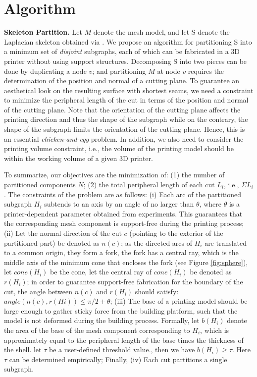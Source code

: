 \section{Algorithm}
\textbf{Skeleton Partition.} Let $M$ denote the mesh model, and let S denote the Laplacian skeleton obtained via \cite{AuTCCL08}. We propose an algorithm for partitioning S into a minimum set of \emph{disjoint} subgraphs, each of which can be fabricated in a 3D printer without using support structures. Decomposing S into two pieces can be done by duplicating a node $v$; and partitioning $M$ at node $v$ requires the determination of the position and normal of a cutting plane. To guarantee an aesthetical look on the resulting surface with shortest seams, we need a constraint to minimize the peripheral length of the cut in terms of the position and normal of the cutting plane. Note that the orientation of the cutting plane affects the printing direction and thus the shape of the subgraph while on the contrary, the shape of the subgraph limits the orientation of the cutting plane. Hence, this is an essential \emph{chicken-and-egg} problem. In addition, we also need to consider the printing volume constraint, i.e., the volume of the printing model should be within the working volume of a given 3{D} printer.

To summarize, our objectives are the minimization of: (1) the number of partitioned components $N$; (2) the total peripheral length of each cut $L_i$, i.e., $\Sigma L_i$. The constraints of the problem are as follows:
(i) Each arc of the partitioned subgraph $H_i$ subtends to an axis by an angle of no larger than $\theta$, where $\theta$ is a printer-dependent parameter obtained from experiments. This guarantees that the corresponding mesh component is support-free during the printing process;
(ii) Let the normal direction of the cut $c$ (pointing to the exterior of the partitioned part) be denoted as $n(c)$; as the directed arcs of $H_i$ are translated to a common origin, they form a fork, the fork has a central ray, which is the middle axis of the minimum cone that encloses the fork (see Figure \ref{fig:sphere}), let $cone(H_i)$ be the cone, let the central ray of $cone(H_i)$ be denoted as $r(H_i)$; in order to guarantee support-free fabrication for the boundary of the cut, the angle between $n(c)$ and $r(H_i)$ should satisfy: $angle(n(c), r(Hi)) \leq \pi/2 + \theta$;
(iii) The base of a printing model should be large enough to gather sticky force from the building platform, such that the model is not deformed during the building process. Formally, let $b(H_i)$ denote the area of the base of the mesh component corresponding to $H_i$, which is approximately equal to the peripheral length of the base times the thickness of the shell. let $\tau$ be a user-defined threshold value., then we have $b(H_i) \geq \tau$. Here $\tau$ can be determined empirically; Finally,
(iv) Each cut partitions a single subgraph.

